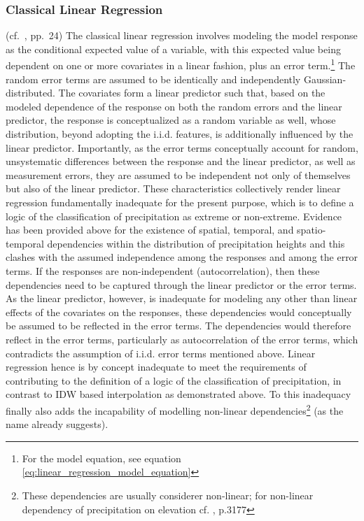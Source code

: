\documentclass[
  12pt,
]{article}
\begin{document}
\hypertarget{classical-linear-regression}{%
\subsubsection{Classical Linear
Regression}\label{classical-linear-regression}}

\begingroup
\justify

(cf.~\cite{Fahrmeir.2021}, pp.~24) The classical linear regression
involves modeling the model response as the conditional expected value
of a variable, with this expected value being dependent on one or more
covariates in a linear fashion, plus an error
term.\footnote{For the model equation, see equation  \ref{eq:linear_regression_model_equation}}
The random error terms are assumed to be identically and independently
Gaussian-distributed. The covariates form a linear predictor such that,
based on the modeled dependence of the response on both the random
errors and the linear predictor, the response is conceptualized as a
random variable as well, whose distribution, beyond adopting the i.i.d.
features, is additionally influenced by the linear predictor.
Importantly, as the error terms conceptually account for random,
unsystematic differences between the response and the linear predictor,
as well as measurement errors, they are assumed to be independent not
only of themselves but also of the linear predictor. These
characteristics collectively render linear regression fundamentally
inadequate for the present purpose, which is to define a logic of the
classification of precipitation as extreme or non-extreme. Evidence has
been provided above for the existence of spatial, temporal, and
spatio-temporal dependencies within the distribution of precipitation
heights and this clashes with the assumed independence among the
responses and among the error terms. If the responses are
non-independent (autocorrelation), then these dependencies need to be
captured through the linear predictor or the error terms. As the linear
predictor, however, is inadequate for modeling any other than linear
effects of the covariates on the responses, these dependencies would
conceptually be assumed to be reflected in the error terms. The
dependencies would therefore reflect in the error terms, particularly as
autocorrelation of the error terms, which contradicts the assumption of
i.i.d. error terms mentioned above. Linear regression hence is by
concept inadequate to meet the requirements of contributing to the
definition of a logic of the classification of precipitation, in
contrast to IDW based interpolation as demonstrated above. To this
inadequacy finally also adds the incapability of modelling non-linear
dependencies\footnote{These dependencies are usually considerer non-linear; for non-linear dependency of precipitation on elevation cf. \cite{Chu.2012}, p.3177}
(as the name already suggests).
\end{document}
